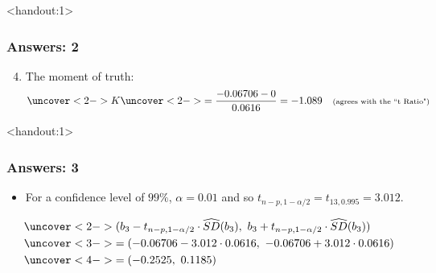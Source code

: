 \documentclass[handout]{beamer}\usepackage{graphicx, color}
\newcommand{\answers}{1}
\providecommand{\wh}[1]{\widehat{#1}}
\numberwithin{equation}{section}
\begin{document}
\begin{frame}<handout:\answers>
\frametitle{Answers: 2} \small
\begin{enumerate}
\setcounter{enumi}{3}
\item The moment of truth:
\begin{align*}
\uncover<2->{K} & \uncover<2->{= \frac{-0.06706 - 0}{0.0616} = -1.089 \quad \text{\scriptsize (agrees with the ``t Ratio")}} \\
\end{align*}
\end{enumerate}
\end{frame}


\begin{frame}<handout:\answers>
\frametitle{Answers: 3} \small
\begin{itemize}
\item For a confidence level of $99\%$, $\alpha = 0.01$ and so $t_{n - p, 1 - \alpha/2} = t_{13, 0.995} = 3.012$.
\end{itemize}
\begin{align*}
&\uncover<2->{(b_3 - t_{n - p, 1 - \alpha/2} \cdot \wh{SD}(b_3), \ b_3 + t_{n - p, 1 - \alpha/2}\cdot \wh{SD}(b_3))} \\
&\uncover<3->{=  (-0.06706 - 3.012 \cdot 0.0616, \ -0.06706 + 3.012 \cdot 0.0616)} \\
&\uncover<4->{= (-0.2525, \ 0.1185)}
\end{align*}
\begin{itemize}
\end{itemize}
\end{frame}
\end{document}
